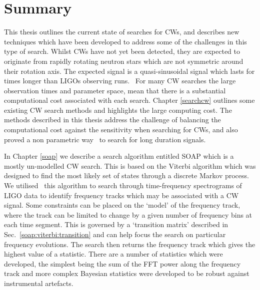 \chapter{\label{summary}Summary}


This thesis outlines the current state of searches for \glspl{CW}, and
describes new techniques which have been developed to address some of the
challenges in this type of search.  Whilst \glspl{CW} have not yet been
detected, they are expected to originate from rapidly rotating neutron stars
which are not symmetric around their rotation axis.  The expected signal is a
quasi-sinusoidal signal which lasts for times longer than \glspl{LIGO}
observing runs.~  For many
\gls{CW} searches the large observation times and parameter space, mean that
there is a substantial computational cost associated with each search.  Chapter
\ref{searchcw} outlines some existing \gls{CW} search methods and highlights
the large computing cost.  The methods described in this thesis address the
challenge of balancing the computational cost against the sensitivity when
searching for \glspl{CW}, and also proved a non parametric way~ to search for long duration signals.

\bigskip

In Chapter \ref{soap} we describe a search algorithm entitled SOAP which is a
mostly un-modelled \gls{CW} search.  This is based on the Viterbi algorithm
which was designed to find the most likely set of states through a discrete
Markov process.  We utilised~ this algorithm to search through
time-frequency spectrograms of \gls{LIGO} data to identify frequency tracks
which may be associated with a \gls{CW} signal.  Some constraints can be placed
on the `model' of the frequency track, where the track can be limited to change
by a given number of frequency bins at each time segment.  This is governed by
a `transition matrix' described in Sec.~\ref{soap:viterbi:transition} and can
help focus the search on particular frequency evolutions.  The search then
returns the frequency track which gives the highest value of a statistic.
There are a number of statistics which were developed, the simplest being the
sum of the \gls{FFT} power along the frequency track and more complex Bayesian
statistics were developed to be robust against instrumental artefacts.

